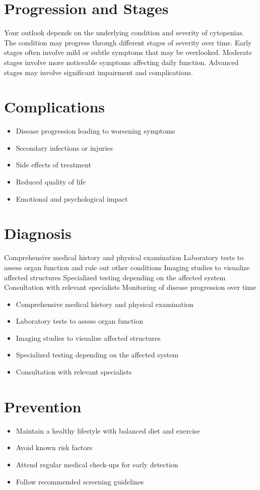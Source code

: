 \section{Progression and Stages}
Your outlook depends on the underlying condition and severity of cytopenias. The condition may progress through different stages of severity over time. Early stages often involve mild or subtle symptoms that may be overlooked. Moderate stages involve more noticeable symptoms affecting daily function. Advanced stages may involve significant impairment and complications.
\section{Complications}
\begin{itemize}[noitemsep]
  \item Disease progression leading to worsening symptoms
  \item Secondary infections or injuries
  \item Side effects of treatment
  \item Reduced quality of life
  \item Emotional and psychological impact
\end{itemize}
\section{Diagnosis}
Comprehensive medical history and physical examination Laboratory tests to assess organ function and rule out other conditions Imaging studies to visualize affected structures Specialized testing depending on the affected system Consultation with relevant specialists Monitoring of disease progression over time

\begin{itemize}[noitemsep]
  \item Comprehensive medical history and physical examination
  \item Laboratory tests to assess organ function
  \item Imaging studies to visualize affected structures
  \item Specialized testing depending on the affected system
  \item Consultation with relevant specialists
\end{itemize}
\section{Prevention}
\begin{itemize}[noitemsep]
  \item Maintain a healthy lifestyle with balanced diet and exercise
  \item Avoid known risk factors
  \item Attend regular medical check-ups for early detection
  \item Follow recommended screening guidelines
\end{itemize}

